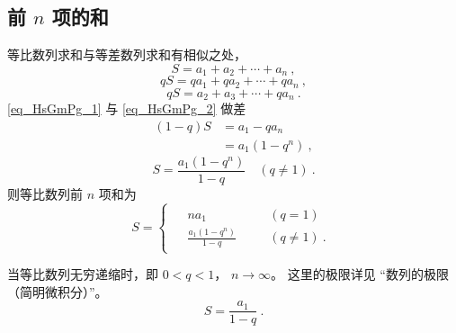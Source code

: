 \subsection{前 $n$ 项的和}
等比数列求和与等差数列求和有相似之处，
\begin{equation}\label{eq_HsGmPg_1}
S = a_1 + a_2 + \cdots + a_n~,
\end{equation}
\begin{equation}
qS = qa_1 + qa_2 + \cdots + qa_n~,
\end{equation}
\begin{equation}\label{eq_HsGmPg_2}
qS= a_2 + a_3 + \cdots + qa_n~.
\end{equation}
\autoref{eq_HsGmPg_1} 与 \autoref{eq_HsGmPg_2} 做差
\begin{equation}
\begin{aligned}
(1 - q)S &= a_1 - qa_n\\
&= a_1(1 - q^n)~,
\end{aligned}
\end{equation}
\begin{equation}
S = \frac{a_1(1-q^n)}{1-q} \quad (q\neq 1)~.
\end{equation}
则等比数列前 $n$ 项和为
\begin{equation}
S = 
\begin{cases}
\begin{aligned}
&na_1 &\quad &(q = 1) \\
&\frac{a_1(1-q^n)}{1-q} &\quad &(q \neq 1)~.
\end{aligned}
\end{cases}
\end{equation}

当等比数列无穷递缩时，即 $0<q<1$， $n\rightarrow \infty$。 这里的极限详见 “数列的极限（简明微积分）”。
\begin{equation}
S = \frac{a_1}{1 - q}~.
\end{equation}
